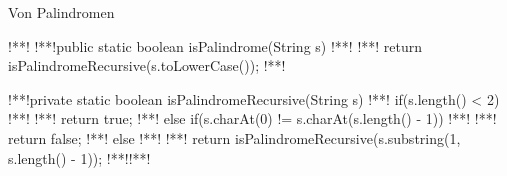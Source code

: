\begin{frame}[fragile]{Von Palindromen}
\SetupLstHl{}%
\begin{plainjava}
!**!
!**!public static boolean isPalindrome(String s) { !**!
!**!    return isPalindromeRecursive(s.toLowerCase());
!**!}


!**!private static boolean isPalindromeRecursive(String s) {
!**!    if(s.length() < 2) !**!
!**!        return true;
!**!    else if(s.charAt(0) != s.charAt(s.length() - 1)) !**!
!**!        return false;
!**!    else !**!
!**!        return isPalindromeRecursive(s.substring(1, s.length() - 1));
!**!}!**!
\end{plainjava}
\end{frame}

